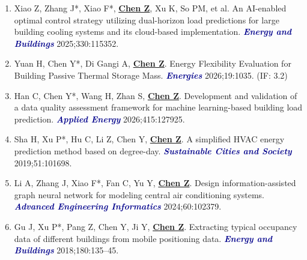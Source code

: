 \documentclass[11pt,a4paper]{article}
\newcommand{\me}[1]{\underline{\textbf{#1}}}
\newcommand{\journal}[1]{\textcolor{darkblue}{\textbf{\textit{#1}}}}
\begin{document}
\begin{enumerate}
\item Xiao Z, Zhang J*, Xiao F*, \me{Chen Z}, Xu K, So PM, et al. An AI-enabled optimal control strategy utilizing dual-horizon load predictions for large building cooling systems and its cloud-based implementation. \journal{Energy and Buildings} 2025;330:115352.

\item Yuan H, Chen Y*, Di Gangi A, \me{Chen Z}. Energy Flexibility Evaluation for Building Passive Thermal Storage Mass. \journal{Energies} 2026;19:1035. (IF: 3.2)

\item Han C, Chen Y*, Wang H, Zhan S, \me{Chen Z}. Development and validation of a data quality assessment framework for machine learning-based building load prediction. \journal{Applied Energy} 2026;415:127925.

\item Sha H, Xu P*, Hu C, Li Z, Chen Y, \me{Chen Z}. A simplified HVAC energy prediction method based on degree-day. \journal{Sustainable Cities and Society} 2019;51:101698.

\item Li A, Zhang J, Xiao F*, Fan C, Yu Y, \me{Chen Z}. Design information-assisted graph neural network for modeling central air conditioning systems. \journal{Advanced Engineering Informatics} 2024;60:102379.

\item Gu J, Xu P*, Pang Z, Chen Y, Ji Y, \me{Chen Z}. Extracting typical occupancy data of different buildings from mobile positioning data. \journal{Energy and Buildings} 2018;180:135--45.
\end{enumerate}
\end{document}
